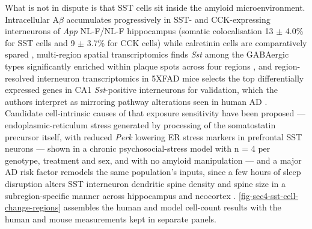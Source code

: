 \documentclass[11pt]{article}
\begin{document}
What is not in dispute is that SST cells sit inside the amyloid microenvironment. Intracellular A$\beta$ accumulates progressively in SST- and CCK-expressing interneurons of \emph{App} NL-F/NL-F hippocampus (somatic colocalisation 13 $\pm$ 4.0\% for SST cells and 9 $\pm$ 3.7\% for CCK cells) while calretinin cells are comparatively spared \citep{Shi2019}, multi-region spatial transcriptomics finds \emph{Sst} among the GABAergic types significantly enriched within plaque spots across four regions \citep{Bayaraa2025}, and region-resolved interneuron transcriptomics in 5XFAD mice selects the top differentially expressed genes in CA1 \emph{Sst}-positive interneurons for validation, which the authors interpret as mirroring pathway alterations seen in human AD \citep{Chen2025a}. Candidate cell-intrinsic causes of that exposure sensitivity have been proposed --- endoplasmic-reticulum stress generated by processing of the somatostatin precursor itself, with reduced \emph{Perk} lowering ER stress markers in prefrontal SST neurons --- shown in a chronic psychosocial-stress model with n = 4 per genotype, treatment and sex, and with no amyloid manipulation \citep{Tomoda2022} --- and a major AD risk factor remodels the same population's inputs, since a few hours of sleep disruption alters SST interneuron dendritic spine density and spine size in a subregion-specific manner across hippocampus and neocortex \citep{Raven2025}. \ref{fig-sec4-sst-cell-change-regions} assembles the human and model cell-count results with the human and mouse measurements kept in separate panels.
\end{document}

